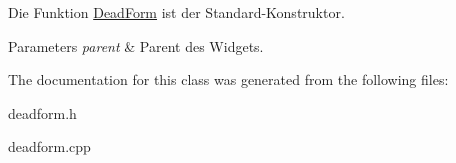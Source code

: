 Die Funktion \hyperlink{class_dead_form}{Dead\+Form} ist der Standard-\/\+Konstruktor. 


\begin{DoxyParams}{Parameters}
{\em parent} & Parent des Widgets. \\
\hline
\end{DoxyParams}


The documentation for this class was generated from the following files\+:\begin{DoxyCompactItemize}
\item 
deadform.\+h\item 
deadform.\+cpp\end{DoxyCompactItemize}

